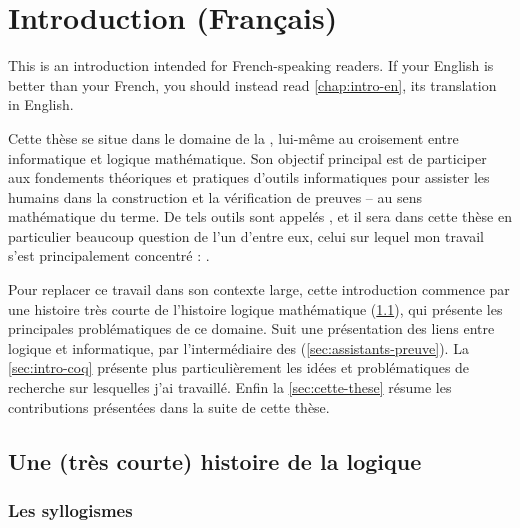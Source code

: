 \chapter{Introduction (Français)}
\label{chap:intro-fr}

\margintoc

\begin{kaobox}[backgroundcolor=Black!10!White,frametitlebackgroundcolor=Black!10!White]
  This  is an introduction intended for French-speaking readers.
  If your English is better than your French,
  you should instead read \cref{chap:intro-en}, its translation in English.
\end{kaobox}

Cette thèse se situe dans le domaine de la , lui-même au croisement entre informatique et logique mathématique.
Son objectif principal est de participer aux fondements théoriques et pratiques
d’outils informatiques pour assister les humains dans la construction
et la vérification de preuves – au sens mathématique du terme.
De tels outils sont appelés , et il sera dans cette thèse
en particulier beaucoup question de l’un d’entre eux, celui
sur lequel mon travail s’est principalement concentré : .

Pour replacer ce travail dans son contexte large, cette introduction
commence par une histoire très courte de l’histoire logique mathématique
(\cref{sec:logique-histoire}), qui présente les principales problématiques de ce domaine.
Suit une présentation des liens entre logique et informatique, par
l’intermédiaire des  (\cref{sec:assistants-preuve}).
La \cref{sec:intro-coq} présente plus particulièrement les idées et problématiques
de recherche sur lesquelles j’ai travaillé.
Enfin la \cref{sec:cette-these} résume les contributions présentées dans la suite de cette
thèse.

\section{Une (très courte) histoire de la logique}
\label{sec:logique-histoire}

\subsection{Les syllogismes}

